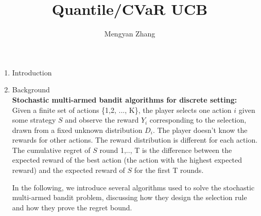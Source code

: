\documentclass[11pt]{article}
\begin{document}
\author{Mengyan Zhang}
\title{Quantile/CVaR UCB}
\maketitle

\medskip

\begin{enumerate}

\item Introduction


\item Background\\
\textbf{Stochastic multi-armed bandit algorithms for discrete setting:}\\
Given a finite set of actions \{1,2, ..., K\}, the player selects one action $i$ given some strategy $S$ and observe the reward $Y_i$ corresponding to the selection, drawn from a fixed unknown distribution $D_i$. The player doesn't know the rewards for other actions. The reward distribution is different for each action. The cumulative regret of $S$ round 1,.., T is the difference between the expected reward of the best action (the action with the highest expected reward) and the expected reward of $S$ for the first T rounds.

In the following, we introduce several algorithms used to solve the stochastic multi-armed bandit problem, discussing how they design the selection rule and how they prove the regret bound. 


\end{enumerate}
\end{document}
